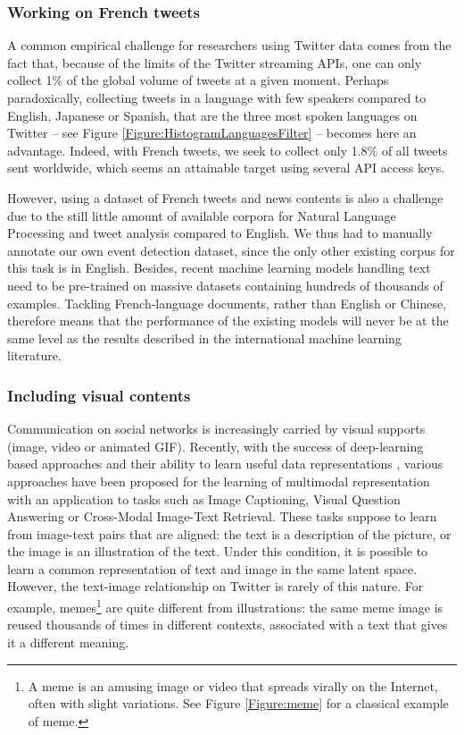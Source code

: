 \subsubsection{Working on French tweets}
A common empirical challenge for researchers
using Twitter data comes from the fact that, because of the limits of the Twitter streaming APIs, one can only collect 1\% of the global volume of tweets at a given moment. Perhaps paradoxically, collecting tweets in a language with few speakers compared to English, Japanese or Spanish, that are the three most spoken languages on Twitter -- see Figure \ref{Figure:HistogramLanguagesFilter} -- becomes here an advantage. Indeed, with French tweets, we seek to collect only 1.8\% of all tweets sent worldwide, which seems an attainable target using several API access keys.

However, using a dataset of French tweets and news contents is also a challenge due to the still little amount of available corpora for Natural Language Processing and tweet analysis compared to English. We thus had to manually annotate our own event detection dataset, since the only other existing corpus for this task is in English. Besides, recent machine learning models handling text need to be pre-trained on massive datasets containing hundreds of thousands of examples. Tackling French-language documents, rather than English or Chinese, therefore means that the performance of the existing models will never be at the same level as the results described in the international machine learning literature.

\subsubsection{Including visual contents}
Communication on social networks is increasingly carried by visual supports (image, video or animated GIF). Recently, with the success of deep-learning based approaches and their ability to learn useful data representations \citep{bengio2013representation}, various approaches have been proposed for the learning of multimodal representation with an application to tasks such as Image Captioning, Visual Question Answering or Cross-Modal Image-Text Retrieval. These tasks suppose to learn from image-text pairs that are aligned: the text is a description of the picture, or the image is an illustration of the text. Under this condition, it is possible to learn a common representation of text and image in the same latent space. However, the text-image relationship on Twitter is rarely of this nature. For example, memes\footnote{A meme is an amusing image or video that spreads virally on the Internet, often with slight variations. See Figure \ref{Figure:meme} for a classical example of meme.} are quite different from illustrations: the same meme image is reused thousands of times in different contexts, associated with a text that gives it a different meaning.

